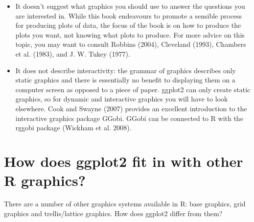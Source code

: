 \begin{itemize}
\item
  It doesn't suggest what graphics you should use to answer the
  questions you are interested in. While this book endeavours to promote
  a sensible process for producing plots of data, the focus of the book
  is on how to produce the plots you want, not knowing what plots to
  produce. For more advice on this topic, you may want to consult
  Robbins (2004), Cleveland (1993), Chambers et al. (1983), and J. W.
  Tukey (1977).
\item
  It does not describe interactivity: the grammar of graphics describes
  only static graphics and there is essentially no benefit to displaying
  them on a computer screen as opposed to a piece of paper. ggplot2 can
  only create static graphics, so for dynamic and interactive graphics
  you will have to look elsewhere. Cook and Swayne (2007) provides an
  excellent introduction to the interactive graphics package GGobi.
  GGobi can be connected to R with the rggobi package (Wickham et al.
  2008).
\end{itemize}

\section{How does ggplot2 fit in with other R graphics?}

There are a number of other graphics systems available in R: base
graphics, grid graphics and trellis/lattice graphics. How does ggplot2
differ from them?

